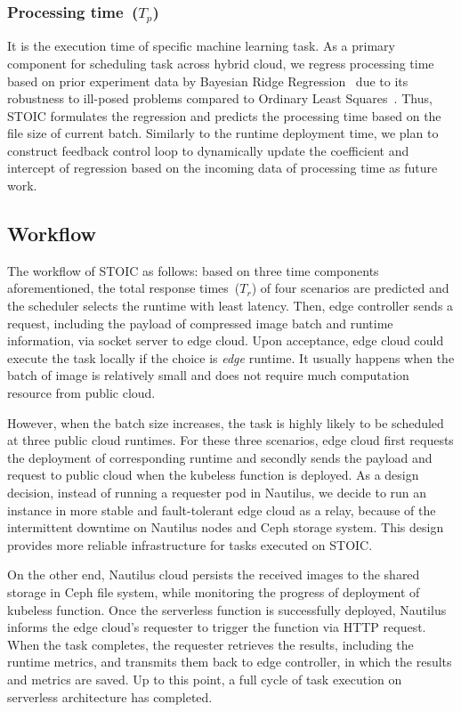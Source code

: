  \subsubsection{Processing time~($T_p$)} It is the execution time of specific machine learning task. As a primary component for scheduling task across hybrid cloud, we regress processing time based on prior experiment data by Bayesian Ridge Regression~\cite{ref:brr} due to its robustness to ill-posed problems compared to Ordinary Least Squares~\cite{ref:ols}. Thus, STOIC formulates the regression and predicts the processing time based on the file size of current batch. Similarly to the runtime deployment time, we plan to construct feedback control loop to dynamically update the coefficient and intercept of regression based on the incoming data of processing time as future work.
 
 \subsection{Workflow}
 The workflow of STOIC as follows: based on three time components aforementioned, the total response times~($T_r$) of four scenarios are predicted and the scheduler selects the runtime with least latency. Then, edge controller sends a request, including the payload of compressed image batch and runtime information, via socket server to edge cloud. Upon acceptance, edge cloud could execute the task locally if the choice is \textit{edge} runtime. It usually happens when the batch of image is relatively small and does not require much computation resource from public cloud.
 
 However, when the batch size increases, the task is highly likely to be scheduled at three public cloud runtimes. For these three scenarios, edge cloud first requests the deployment of corresponding runtime and secondly sends the payload and request to public cloud when the kubeless function is deployed. As a design decision, instead of running a requester pod in Nautilus, we decide to run an instance in more stable and fault-tolerant edge cloud as a relay, because of the intermittent downtime on Nautilus nodes and Ceph storage system. This design provides more reliable infrastructure for tasks executed on STOIC.
 
 On the other end, Nautilus cloud persists the received images to the shared storage in Ceph file system, while monitoring the progress of deployment of kubeless function. Once the serverless function is successfully deployed, Nautilus informs the edge cloud's requester to trigger the function via HTTP request. When the task completes, the requester retrieves the results, including the runtime metrics, and transmits them back to edge controller, in which the results and metrics are saved. Up to this point, a full cycle of task execution on serverless architecture has completed.
 
